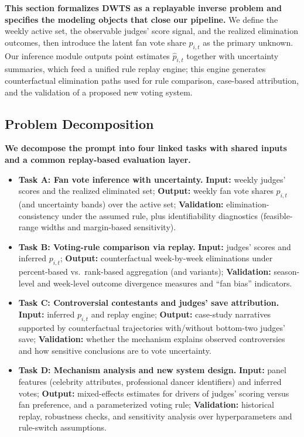 \textbf{This section formalizes DWTS as a replayable inverse problem and specifies the modeling objects that close our pipeline.}
We define the weekly active set, the observable judges' score signal, and the realized elimination outcomes, then introduce the latent fan vote share $p_{i,t}$ as the primary unknown.
Our inference module outputs point estimates $\hat p_{i,t}$ together with uncertainty summaries, which feed a unified rule replay engine; this engine generates counterfactual elimination paths used for rule comparison, case-based attribution, and the validation of a proposed new voting system.

\subsection{Problem Decomposition}\label{sec:problem_decomposition}

\textbf{We decompose the prompt into four linked tasks with shared inputs and a common replay-based evaluation layer.}
\begin{itemize}
    \item \textbf{Task A: Fan vote inference with uncertainty.}
    \textbf{Input:} weekly judges' scores and the realized eliminated set;
    \textbf{Output:} weekly fan vote shares $p_{i,t}$ (and uncertainty bands) over the active set;
    \textbf{Validation:} elimination-consistency under the assumed rule, plus identifiability diagnostics (feasible-range widths and margin-based sensitivity).

    \item \textbf{Task B: Voting-rule comparison via replay.}
    \textbf{Input:} judges' scores and inferred $p_{i,t}$;
    \textbf{Output:} counterfactual week-by-week eliminations under percent-based vs.\ rank-based aggregation (and variants);
    \textbf{Validation:} season-level and week-level outcome divergence measures and ``fan bias'' indicators.

    \item \textbf{Task C: Controversial contestants and judges' save attribution.}
    \textbf{Input:} inferred $p_{i,t}$ and replay engine;
    \textbf{Output:} case-study narratives supported by counterfactual trajectories with/without bottom-two judges' save;
    \textbf{Validation:} whether the mechanism explains observed controversies and how sensitive conclusions are to vote uncertainty.

    \item \textbf{Task D: Mechanism analysis and new system design.}
    \textbf{Input:} panel features (celebrity attributes, professional dancer identifiers) and inferred votes;
    \textbf{Output:} mixed-effects estimates for drivers of judges' scoring versus fan preference, and a parameterized voting rule;
    \textbf{Validation:} historical replay, robustness checks, and sensitivity analysis over hyperparameters and rule-switch assumptions.
\end{itemize}


